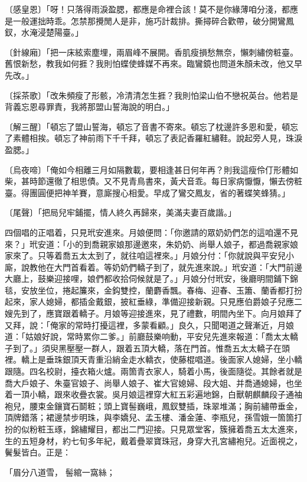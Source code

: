 〔感皇恩〕「呀！只落得雨淚盈腮，都應是命裡合該！莫不是你緣薄咱分淺，都應是一般運拙時乖。怎禁那攪閒人是非，施巧計裁排。撕撏碎合歡帶，破分開鸞鳳釵，水淹浸楚陽臺。」

〔針線廂〕「把一床絃索塵埋，兩眉峰不展開。香肌瘦損愁無奈，懶刺繡傍粧臺。舊恨新愁，教我如何捱？我則怕蝶使蜂媒不再來。臨鸞鏡也問道朱顏未改，他又早先改。」

〔採茶歌〕「改朱頻瘦了形骸，冷清清怎生捱？我則怕梁山伯不戀祝英台。他若是背義忘恩尋罪責，我將那盟山誓海說的明白。」

〔解三醒〕「頓忘了盟山誓海，頓忘了音書不寄來。頓忘了枕邊許多恩和愛，頓忘了素體相挨。頓忘了神前雨下千千拜，頓忘了表記香羅紅繡鞋。說起旁人見，珠淚盈腮。」

〔烏夜啼〕「俺如今相離三月如隔數載，要相逢甚日何年再？則我這瘦伶仃形體如柴，甚時節還徹了相思債。又不見青鳥書來，黃犬音乖。每日家病懨懨，懶去傍粧臺。得團圓便把神羊賽，意廝搜心相愛。早成了鸞交鳳友，省的著蝶笑蜂猜。」

〔尾聲〕「把局兒牢鋪擺，情人終久再歸來，美滿夫妻百歲諧。」

四個唱的正唱着，只見玳安進來。月娘便問：「你邀請的眾奶奶們怎的這咱還不見來？」玳安道：「小的到喬親家娘那邊邀來，朱奶奶、尚舉人娘子，都過喬親家娘家來了。只等着喬五太太到了，就往咱這裡來。」月娘分付：「你就說與平安兒小廝，說教他在大門首看着。等奶奶們轎子到了，就先進來說。」玳安道：「大門前邊大廳上，鼓樂迎接哩，娘們都收拾伺候就是了。」月娘分付玳安，後廳明間鋪下錦毯，安放坐位，捲起簾來，金鈎雙控，蘭麝香飄。春梅、迎春、玉簫、蘭香都打扮起來，家人媳婦，都插金戴銀，披紅垂綠，準備迎接新親。只見應伯爵娘子兒應二嫂先到了，應寶跟着轎子。月娘等迎接進來，見了禮數，明間內坐下。向月娘拜了又拜，說：「俺家的常時打擾這裡，多蒙看顧。」良久，只聞喝道之聲漸近，月娘道：「姑娘好說，常時累你二爹。」前廳鼓樂响動，平安兒先進來報道：「喬太太轎子到了。」須臾黑壓壓一群人，跟着五頂大轎，落在門首。惟喬五太太轎子在頭裡。轎上是垂珠銀頂天青重沿綃金走水轎衣，使藤棍唱道。後面家人媳婦，坐小轎跟隨。四名校尉，擡衣箱火爐。兩箇青衣家人，騎着小馬，後面隨從。其餘者就是喬大戶娘子、朱臺官娘子、尚舉人娘子、崔大官媳婦、段大姐、并喬通媳婦，也坐着一頂小轎，跟來收疊衣裳。吳月娘這裡穿大紅五彩遍地錦，白獸朝麒麟段子通袖袍兒，腰束金鑲寶石鬬粧；頭上寶髻巍峨，鳳釵雙插，珠翠堆滿；胸前繡帶垂金，頂牌錯落；裙邊禁步明珠，與李嬌兒、孟玉樓、潘金蓮、李瓶兒，孫雪娥一箇箇打扮的似粉粧玉琢，錦繡耀目，都出二門迎接。只見眾堂客，簇擁着喬五太太進來，生的五短身材，約七旬多年紀，戴着疊翠寶珠冠，身穿大孔宮繡袍兒。近面視之，鬢髮皆白。正是：

「眉分八道雪，  髻綰一窩絲；


